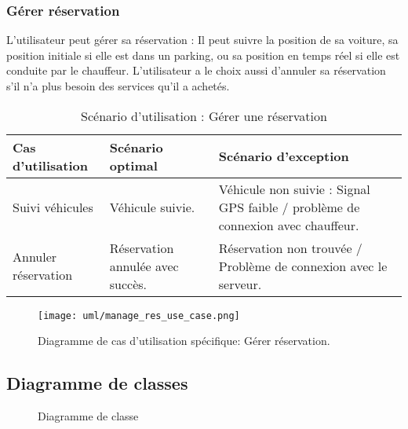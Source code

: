 \subsubsection{Gérer réservation}
L'utilisateur peut gérer sa réservation : Il peut suivre la position de sa voiture, sa position initiale si elle est dans un parking, ou sa position en temps réel si elle est conduite par le chauffeur. L'utilisateur a le choix aussi d'annuler sa réservation s'il n'a plus besoin des services qu'il a achetés.
\begin{table}[H]
    \begin{center}
        \begin{tabularx}{\textwidth} {
                | >{\centering\arraybackslash}X
                | >{\centering\arraybackslash}X
                | >{\centering\arraybackslash}X |}
            \hline
            Cas d'utilisation   & Scénario optimal                 & Scénario d'exception                                                            \\
            \hline
            Suivi véhicules     & Véhicule suivie.                 & Véhicule non suivie : Signal GPS faible / problème de connexion avec chauffeur. \\
            \hline
            Annuler réservation & Réservation annulée avec succès. & Réservation non trouvée / Problème de connexion avec le serveur.                \\
            \hline
        \end{tabularx}
        \captionsetup{justification=centering}
        \caption{Scénario d'utilisation : Gérer une réservation}
        \label{tab:manage_reservation_scenario}
    \end{center}
\end{table}
\begin{figure}[H]
    \centering
    \texttt{[image: uml/manage\_res\_use\_case.png]}
    \vspace{1cm}
    \captionsetup{justification=centering}
    \caption{Diagramme de cas d'utilisation spécifique: Gérer réservation.}
    \label{fig:use_case_manage_res}
\end{figure}
\subsection{Diagramme de classes}
\begin{figure}[H]
    \centering
    \vspace{1cm}
    \captionsetup{justification=centering}

    \caption{Diagramme de classe}
    \label{fig:class_diag}
\end{figure}
\clearpage
